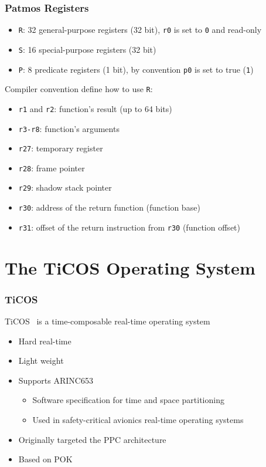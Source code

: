 \documentclass[notheorems]{beamer}
\begin{document}
\begin{frame}
\frametitle{Patmos Registers}
\begin{itemize}
	\item \texttt{R}: 32 general-purpose registers (32 bit), \texttt{r0} is set to \texttt{0} and read-only
	\item \texttt{S}: 16 special-purpose registers (32 bit)
	\item \texttt{P}: 8 predicate registers (1 bit), by convention \texttt{p0} is set to true (\texttt{1})
\end{itemize}
Compiler convention define how to use \texttt{R}:
\begin{itemize}
	\item \texttt{r1} and \texttt{r2}: function's result (up to 64 bits)
	\item \texttt{r3-r8}: function's arguments
	\item \texttt{r27}: temporary register
	\item \texttt{r28}: frame pointer
	\item \texttt{r29}: shadow stack pointer
	\item \texttt{r30}: address of the return function (function base)
	\item \texttt{r31}: offset of the return instruction from \texttt{r30} (function offset)
\end{itemize}
\end{frame}

\section{The TiCOS Operating System}
\begin{frame}
\frametitle{TiCOS}
\begin{block}{}
TiCOS~\cite{baldovin2012time} is a time-composable real-time operating system
\end{block}
\begin{itemize}
	\item Hard real-time
	\item Light weight
	\item Supports ARINC653
		\begin{itemize}
			\item Software specification for time and space partitioning
			\item Used in safety-critical avionics real-time operating systems
		\end{itemize}
	\item Originally targeted the PPC architecture
	\item Based on POK~\cite{delange11osadlpok}
\end{itemize}
\end{frame}
\end{document}
